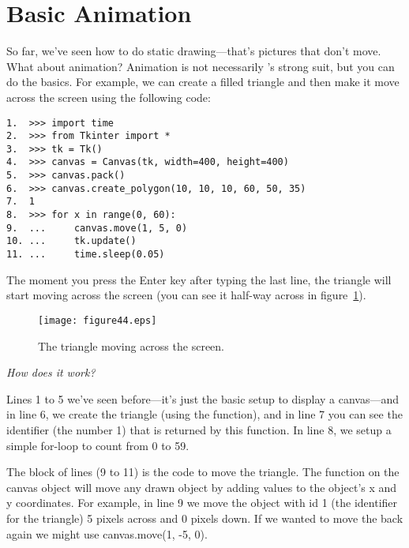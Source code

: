 \section{Basic Animation}

So far, we've seen how to do static drawing---that's pictures that don't move. What about animation? Animation is not necessarily 's strong suit, but you can do the basics. For example, we can create a filled triangle and then make it move across the screen using the following code:

\begin{listingignore}
\begin{verbatim}
1.  >>> import time
2.  >>> from Tkinter import *
3.  >>> tk = Tk()
4.  >>> canvas = Canvas(tk, width=400, height=400)
5.  >>> canvas.pack()
6.  >>> canvas.create_polygon(10, 10, 10, 60, 50, 35)
7.  1
8.  >>> for x in range(0, 60):
9.  ...     canvas.move(1, 5, 0)
10. ...     tk.update()
11. ...     time.sleep(0.05)
\end{verbatim}
\end{listingignore}

The moment you press the Enter key after typing the last line, the triangle will start moving across the screen (you can see it half-way across in figure~\ref{fig44}).

\begin{figure}
\begin{center}
\texttt{[image: figure44.eps]}
\end{center}
\caption{The triangle moving across the screen.}\label{fig44}
\end{figure}

\par
\emph{How does it work?}
\par
Lines 1 to 5 we've seen before---it's just the basic setup to display a canvas---and in line 6, we create the triangle (using the  function), and in line 7 you can see the identifier (the number 1) that is returned by this function. In line 8, we setup a simple for-loop to count from 0 to 59.

The block of lines (9 to 11) is the code to move the triangle. The  function on the canvas object will move any drawn object by adding values to the object's x and y coordinates. For example, in line 9 we move the object with id 1 (the identifier for the triangle) 5 pixels across and 0 pixels down. If we wanted to move the back again we might use canvas.move(1, -5, 0).
 
